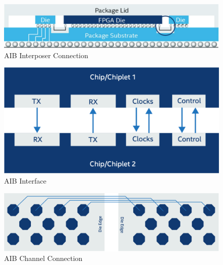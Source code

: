 \documentclass[../main.tex]{subfiles}
\begin{document}
\begin{figure}
    \centering
    \includegraphics[scale=.25]{pngs/Interposer.png}
    \caption{AIB Interposer Connection\cite{AIBWhitePaper}}
    \label{fig:AIBInterposer}
\end{figure}
\begin{figure}
    \centering
    \includegraphics[scale=.32]{pngs/AIB-interface.png}
    \caption{AIB Interface\cite{AIBWhitePaper}}
    \label{fig:AIBInterface}
\end{figure}

\begin{figure}
    \centering
    \includegraphics[scale=.17]{pngs/AIB-Channel.png}
    \caption{AIB Channel Connection\cite{AIBWhitePaper}}
    \label{fig:AIBChannel}
\end{figure}
\end{document}
